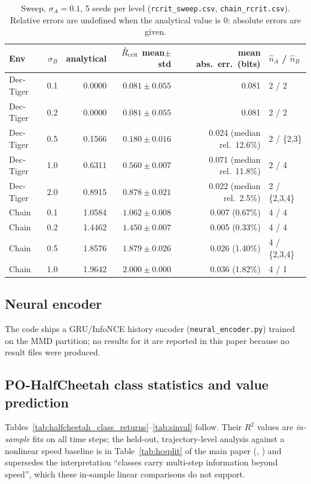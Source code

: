 \documentclass[10pt]{article}
\begin{document}
\begin{table}[h]
\centering
\small
\caption{Sweep, $\sigma_A=0.1$, 5 seeds per level (\texttt{rcrit\_sweep.csv},
  \texttt{chain\_rcrit.csv}).  Relative errors are undefined when the
  analytical value is $0$; absolute errors are given.}
\begin{tabular}{lrrrrl}
\toprule
Env & $\sigma_B$ & analytical & $\hat R_{\rm crit}$ mean$\pm$std & mean abs.\ err.\ (bits) & $\hat n_A$ / $\hat n_B$ \\
\midrule
Dec-Tiger & 0.1 & 0.0000 & $0.081\pm0.055$ & 0.081 & 2 / 2 \\
Dec-Tiger & 0.2 & 0.0000 & $0.081\pm0.055$ & 0.081 & 2 / 2 \\
Dec-Tiger & 0.5 & 0.1566 & $0.180\pm0.016$ & 0.024 (median rel.\ 12.6\%) & 2 / \{2,3\} \\
Dec-Tiger & 1.0 & 0.6311 & $0.560\pm0.007$ & 0.071 (median rel.\ 11.8\%) & 2 / 4 \\
Dec-Tiger & 2.0 & 0.8915 & $0.878\pm0.021$ & 0.022 (median rel.\ 2.5\%) & 2 / \{2,3,4\} \\
\midrule
Chain & 0.1 & 1.0584 & $1.062\pm0.008$ & 0.007 (0.67\%) & 4 / 4 \\
Chain & 0.2 & 1.4462 & $1.450\pm0.007$ & 0.005 (0.33\%) & 4 / 4 \\
Chain & 0.5 & 1.8576 & $1.879\pm0.026$ & 0.026 (1.40\%) & 4 / \{2,3,4\} \\
Chain & 1.0 & 1.9642 & $2.000\pm0.000$ & 0.036 (1.82\%) & 4 / 1 \\
\bottomrule
\end{tabular}
\end{table}

\subsection{Neural encoder}
The code ships a GRU/InfoNCE history encoder
(\texttt{neural\_encoder.py}) trained on the MMD partition; no results for it
are reported in this paper because no result files were produced.

\subsection{PO-HalfCheetah class statistics and value prediction}
Tables~\ref{tab:halfcheetah_class_returns}--\ref{tab:sinval} follow.  Their $R^2$ values
are \emph{in-sample} fits on all time steps; the held-out, trajectory-level
analysis against a nonlinear speed baseline is in Table~\ref{tab:hcsplit} of the
main paper (,
) and supersedes the interpretation
``classes carry multi-step information beyond speed'', which these in-sample
linear comparisons do not support.
\end{document}

